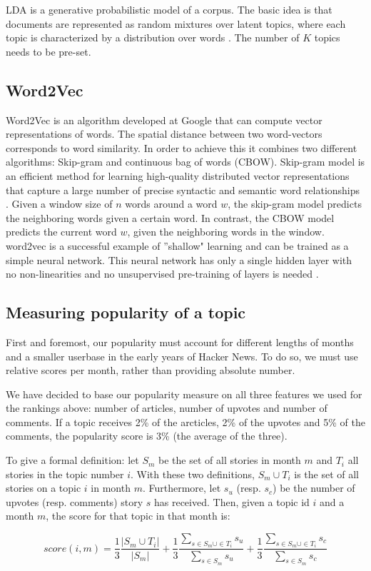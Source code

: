 LDA is a generative probabilistic model of a corpus. The basic idea is that documents are represented as random mixtures over latent topics, where each topic is characterized by a distribution over words \cite{blei2003latent}. The number of $K$ topics needs to be pre-set.

\subsection{Word2Vec}
Word2Vec is an algorithm developed at Google that can compute vector representations of
words. The spatial distance between two word-vectors corresponds to word similarity. In order to achieve this it combines two different algorithms: Skip-gram and continuous bag of words (CBOW). Skip-gram model is an efficient method for learning high-quality distributed vector representations that capture a large number of precise syntactic and semantic word relationships \cite{mikolov2013distributed}. Given a window size of $n$ words around a word $w$, the skip-gram model predicts the neighboring words given a certain word. In contrast, the CBOW model predicts the current word $w$, given the neighboring words in the window. word2vec is a successful example of ''shallow" learning and can be trained as a simple neural network. This neural network has only a single hidden layer with no non-linearities and no unsupervised pre-training of layers is needed \cite{wang2014introduction}. 

\subsection{Measuring popularity of a topic}
First and foremost, our popularity must account for different lengths of months and a smaller userbase in the early years of Hacker News. To do so, we must use relative scores per month, rather than providing absolute number.

We have decided to base our popularity measure on all three features we used for the rankings above: number of articles, number of upvotes and number of comments. If a topic receives 2\% of the arcticles, 2\% of the upvotes and 5\% of the comments, the popularity score is 3\% (the average of the three).

To give a formal definition: let $S_m$ be the set of all stories in month $m$ and $T_i$ all stories in the topic number $i$. With these two definitions, $S_m \cup T_i$ is the set of all stories on a topic $i$ in month $m$. Furthermore, let $s_u$ (resp. $s_c$) be the number of upvotes (resp. comments) story $s$ has received. Then, given a topic id $i$ and a month $m$, the score for that topic in that month is:

$$
	score(i, m) = 
		\frac{1}{3} \frac{|S_m \cup T_i|}{|S_m|} + 
		\frac{1}{3} \frac{\sum_{s \in S_m \cup \in T_i} s_u}{\sum_{s \in S_m} s_u}  + 
		\frac{1}{3} \frac{\sum_{s \in S_m \cup \in T_i} s_c}{\sum_{s \in S_m} s_c}
$$
